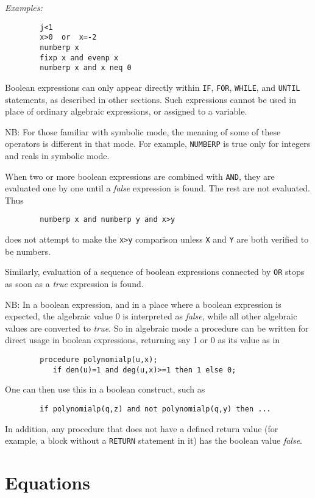 \documentclass[11pt,letterpaper]{book}
\begin{document}
{\it Examples:}
{\small\begin{verbatim}
        j<1
        x>0  or  x=-2
        numberp x
        fixp x and evenp x
        numberp x and x neq 0
\end{verbatim}}
Boolean expressions can only appear directly within {\tt IF}, {\tt FOR},
{\tt WHILE}, and {\tt UNTIL} statements, as described in other sections.
Such expressions cannot be used in place of ordinary algebraic expressions,
or assigned to a variable.

NB:  For those familiar with symbolic mode, the meaning of some of
these operators is different in that mode.  For example, {\tt NUMBERP} is
true only for integers and reals in symbolic mode.

When two or more boolean expressions are combined with {\tt AND}, they are
evaluated one by one until a {\em false\/} expression is found. The rest are
not evaluated. Thus
{\small\begin{verbatim}
        numberp x and numberp y and x>y
\end{verbatim}}
does not attempt to make the {\tt x>y} comparison unless {\tt X} and {\tt Y}
are both verified to be numbers.

Similarly, evaluation of a sequence of boolean expressions connected by
{\tt OR} stops as soon as a {\em true\/} expression is found.

NB:  In a boolean expression, and in a place where a boolean expression is
expected, the algebraic value 0 is interpreted as {\em false}, while all
other algebraic values are converted to {\em true}.  So in algebraic mode
a procedure can be written for direct usage in boolean expressions,
returning say 1 or 0 as its value as in

{\small\begin{verbatim}
        procedure polynomialp(u,x);
           if den(u)=1 and deg(u,x)>=1 then 1 else 0;
\end{verbatim}}

One can then use this in a boolean construct, such as
{\small\begin{verbatim}
        if polynomialp(q,z) and not polynomialp(q,y) then ...
\end{verbatim}}

In addition, any procedure that does not have a defined return value
(for example, a block without a {\tt RETURN} statement in it)
has the boolean value {\em false}.

\section{Equations}
\end{document}
